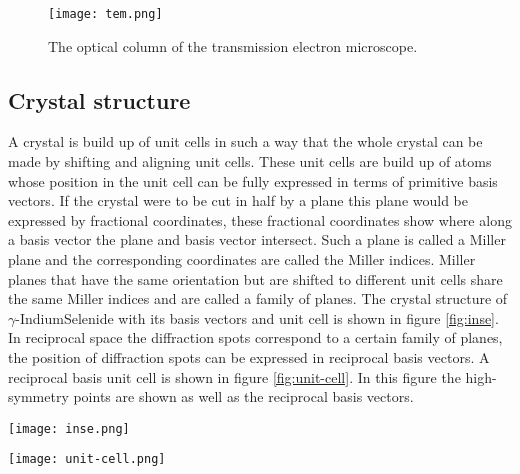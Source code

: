 

\begin{figure}
	\centering
	\texttt{[image: tem.png]}
	\caption{The optical column of the transmission electron microscope.}
	\label{fig:tem}
\end{figure}

\subsection{Crystal structure}
A crystal is build up of unit cells in such a way that the whole crystal can be made by shifting and aligning unit cells. These unit cells are build up of atoms whose position in the unit cell can be fully expressed in terms of primitive basis vectors. If the crystal were to be cut in half by a plane this plane would be expressed by fractional coordinates, these fractional coordinates show where along a basis vector the plane and basis vector intersect. Such a plane is called a Miller plane and the corresponding coordinates are called the Miller indices. Miller planes that have the same orientation but are shifted to different unit cells share the same Miller indices and are called a family of planes. The crystal structure of $\gamma$-IndiumSelenide with its basis vectors and unit cell is shown in figure \ref{fig:inse}.
In reciprocal space the diffraction spots correspond to a certain family of planes, the position of diffraction spots can be expressed in reciprocal basis vectors. A reciprocal basis unit cell is shown in figure \ref{fig:unit-cell}. In this figure the high-symmetry points are shown as well as the reciprocal basis vectors.

\begin{minipage}{0.48\textwidth}
	\centering
	\captionsetup{width=0.9\linewidth}
	\texttt{[image: inse.png]}
	\label{fig:inse}
\end{minipage}%
\begin{minipage}{0.48\textwidth}
	\centering
	\captionsetup{width=0.9\linewidth}
	\texttt{[image: unit-cell.png]}
	\label{fig:unit-cell}
\end{minipage}

